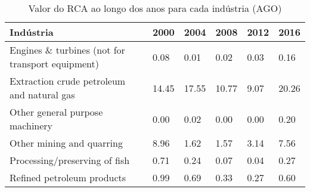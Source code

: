 \begin{table}
\centering
\caption{Valor do RCA ao longo dos anos para cada indústria (AGO)}
\label{tab:ex3-tempo-AGO}
\begin{tabular}{p{6cm}p{1.5cm}p{1.5cm}p{1.5cm}p{1.5cm}p{1.5cm}}
\toprule
                                       Indústria &  2000 &  2004 &  2008 & 2012 &  2016 \\
\midrule
Engines \& turbines (not for transport equipment) &  0.08 &  0.01 &  0.02 & 0.03 &  0.16 \\
      Extraction crude petroleum and natural gas & 14.45 & 17.55 & 10.77 & 9.07 & 20.26 \\
                 Other general purpose machinery &  0.00 &  0.02 &  0.00 & 0.00 &  0.20 \\
                       Other mining and quarring &  8.96 &  1.62 &  1.57 & 3.14 &  7.56 \\
                   Processing/preserving of fish &  0.71 &  0.24 &  0.07 & 0.04 &  0.27 \\
                      Refined petroleum products &  0.99 &  0.69 &  0.33 & 0.27 &  0.60 \\
\bottomrule
\end{tabular}
\end{table}
